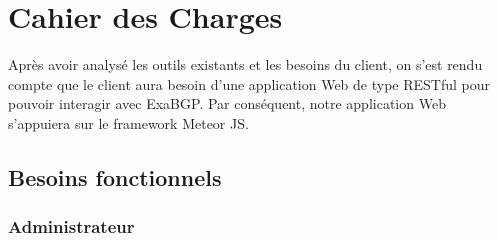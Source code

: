 \section{Cahier des Charges}
Après avoir analysé les outils existants et les besoins du client, on s'est rendu compte que le client aura besoin d'une application Web de type RESTful pour pouvoir interagir avec ExaBGP.
\newline
Par conséquent, notre application Web s'appuiera sur le framework Meteor JS. 

\subsection{Besoins fonctionnels}

\subsubsection{Administrateur}
